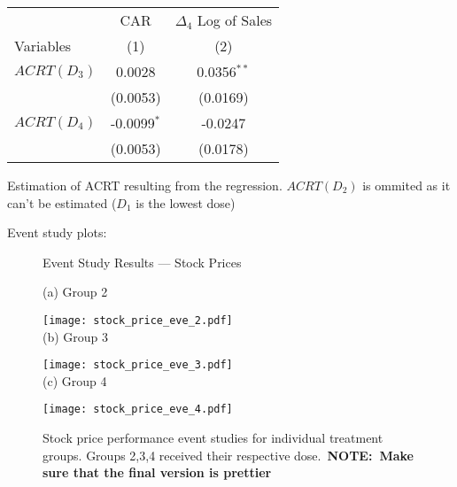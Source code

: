 \documentclass[12pt]{article}
\begin{document}
\begin{table}[!htbp] \centering
  \label{}

  \begin{tabular}{lcc}
        \toprule
        \toprule
                                    & CAR           & $\Delta_4$ Log of Sales \\
        Variables                   & (1)           & (2)\\
        \midrule
        $ACRT(D_3)$                 & 0.0028         & 0.0356$^{**}$ \\
                                    & (0.0053)      & (0.0169)\\
        $ACRT(D_4)$                 & -0.0099$^{*}$  & -0.0247\\
                                    & (0.0053)      & (0.0178)\\
        \bottomrule
    \end{tabular}

    \begin{tablenotes}
        \footnotesize
    \item Estimation of ACRT resulting from the regression. $ACRT(D_2)$ is ommited as it can't be estimated ($D_1$ is the lowest dose)
    \end{tablenotes}

\end{table}



Event study plots:

\begin{figure}
    \caption{Event Study Results --- Stock Prices}
    \centering

    (a) Group 2
    
    \texttt{[image: stock\_price\_eve\_2.pdf]} \\
    
    (b) Group 3
    
    \texttt{[image: stock\_price\_eve\_3.pdf]} \\
    
    (c) Group 4
    
    \texttt{[image: stock\_price\_eve\_4.pdf]}
    
    \captionsetup{font=footnotesize}
    \caption*{Stock price performance event studies for individual treatment groups. Groups 2,3,4 received their respective dose.\ \textbf{NOTE:~Make sure that the final version is prettier}}
\end{figure}
\end{document}
